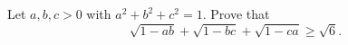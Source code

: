 Let $a,b,c>0$ with $a^2+b^2+c^2=1$. Prove that
\[
\sqrt{1-ab}+\sqrt{1-bc}+\sqrt{1-ca}\ge\sqrt6 .
\]
